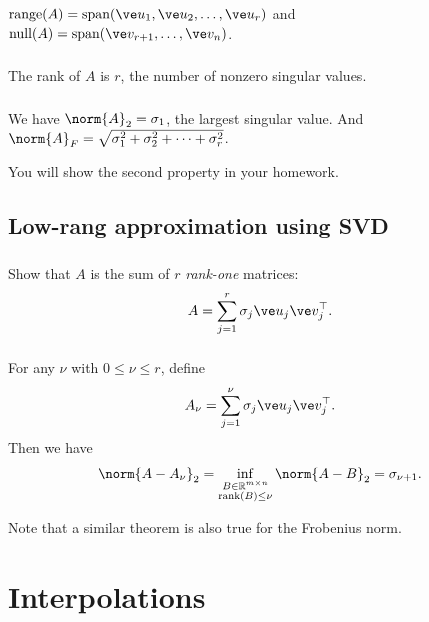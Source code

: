 \documentclass[11pt,letterpaper]{report}
\begin{document}
\subsection{}
$\text{range}(A) = \text{span}(\ve u_1,\ve u_2,\dots,\ve u_r)$ and $\text{null}(A) = \text{span}(\ve v_{r+1},\dots,\ve v_n)$. 

\subsection{}
The rank of $A$ is $r$, the number of nonzero singular values.

\subsection{}
We have $\norm{A}_2 = \sigma_1$, the largest singular value. And $\norm{A}_F = \sqrt{\sigma_1^2+\sigma_2^2+\dots+\sigma_r^2}$. 

You will show the second property in your homework.

\section{Low-rang approximation using SVD}
\subsection{}
Show that $A$ is the sum of $r$ \emph{rank-one} matrices:
\begin{align*}
    A = \sum_{j=1}^r \sigma_j \ve u_j \ve v_j^\top.
\end{align*}

\subsection{}
For any $\nu$ with $0\leq \nu \leq r$, define
\begin{align*}
    A_\nu = \sum_{j=1}^\nu \sigma_j \ve u_j \ve v_j^\top.
\end{align*}
Then we have
\begin{align*}
    \norm{A-A_\nu}_2 = \inf_{\substack{B\in\mathbb{R}^{m\times n}\\\text{rank}(B)\leq\nu}}\norm{A-B}_2 = \sigma_{\nu+1}.
\end{align*}

Note that a similar theorem is also true for the Frobenius norm.
\chapter{Interpolations}
\end{document}
